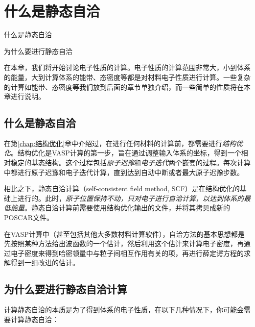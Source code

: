 \section{什么是静态自洽}\label{sec:什么是静态自洽}

\begin{Abstract}
    \item 什么是静态自洽
    \item 为什么要进行静态自洽
\end{Abstract}

在本章，我们将开始讨论电子性质的计算。电子性质的计算范围非常大，小到体系的能量，大到计算体系的能带、态密度等都是对材料电子性质进行计算。一些复杂的计算如能带、态密度等我们放到后面的章节单独介绍，而一些简单的性质将在本章进行说明。

\subsection{什么是静态自洽}\label{subsec:什么是静态自洽-什么是静态自洽}

在第\ref{chap:结构优化}章中介绍过，在进行任何材料的计算前，都需要进行\emph{结构优化}。结构优化是VASP计算的第一步，旨在通过调整输入体系的坐标，得到一个相对稳定的基态结构。这个过程包括\emph{原子迟豫}和\emph{电子迭代}两个嵌套的过程。每次计算中都进行原子迟豫和电子迭代计算，直到达到自动中断或者最大原子迟豫步数。

相比之下，静态自洽计算（self-consistent field method, SCF）是在结构优化的基础上进行的。此时，\emph{原子位置保持不动，只对电子进行自洽计算，以达到体系的最低能量}。静态自洽计算前需要使用结构优化输出的文件，并将其拷贝成新的POSCAR文件。

\begin{extend}
    在VASP计算中（甚至包括其他大多数材料计算软件），自洽方法的基本思想都是先按照某种方法给出波函数的一个估计，然后利用这个估计来计算电子密度，再通过电子密度来得到哈密顿量中与粒子间相互作用有关的项，再进行薛定谔方程的求解得到一组改进的估计。
\end{extend}

\subsection{为什么要进行静态自洽计算}\label{subsec:什么是静态自洽-为什么要进行静态自洽计算}

计算静态自洽的本质是为了得到体系的电子性质，在以下几种情况下，你可能会需要计算静态自洽：

